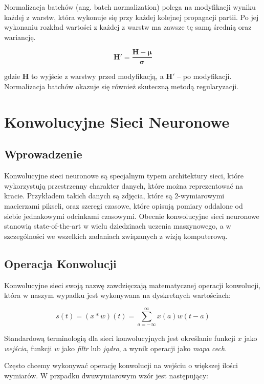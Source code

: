 \documentclass[licencjacka]{pracamgr}
\begin{document}
Normalizacja batchów (ang. batch normalization) \cite{batch-norm} polega na modyfikacji wyniku każdej z warstw, która wykonuje się przy każdej kolejnej propagacji partii. Po jej wykonaniu rozkład wartości z każdej z warstw ma zawsze tę samą średnią oraz wariancję.

$$ \mathbf{H'} = \frac{\mathbf{H} - \mathbf{\mu}}{\mathbf{\sigma}} $$

gdzie $ \mathbf{H} $ to wyjście z warstwy przed modyfikacją, a $ \mathbf{H'} $ -- po modyfikacji. Normalizacja batchów okazuje się również skuteczną metodą regularyzacji.

\section{Konwolucyjne Sieci Neuronowe}

\subsection{Wprowadzenie}

Konwolucyjne sieci neuronowe \cite{lecun-cnn, krizhevsky-cnn} są specjalnym typem architektury sieci, które wykorzystują przestrzenny charakter danych, które można reprezentować na kracie. Przykładem takich danych są zdjęcia, które są 2-wymiarowymi macierzami pikseli, oraz szeregi czasowe, które opisują pomiary oddalone od siebie jednakowymi odcinkami czasowymi. Obecnie konwolucyjne sieci neuronowe stanowią state-of-the-art w wielu dziedzinach uczenia maszynowego, a w szczególności we wszelkich zadaniach związanych z wizją komputerową. 

\subsection{Operacja Konwolucji}

Konwolucyjne sieci swoją nazwę zawdzięczają matematycznej operacji konwolucji, która w naszym wypadku jest wykonywana na dyskretnych wartościach:

$$ s(t) = (x * w)(t) = \sum_{a = -\infty}^{\infty} x(a)w(t - a) $$

Standardową terminologią dla sieci konwolucyjnych jest określanie funkcji $x$ jako \emph{wejścia}, funkcji $w$ jako \emph{filtr} lub \emph{jądro}, a wynik operacji jako \emph{mapa cech}.

Często chcemy wykonywać operację konwolucji na wejściu o większej ilości wymiarów. W przpadku dwuwymiarowym wzór jest następujący:
\end{document}
